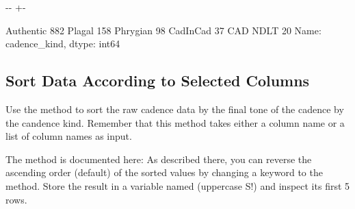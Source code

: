 \documentclass[letterpaper,10pt,english]{sphinxmanual}
\newlength\nbsphinxcodecellspacing
\begin{document}
{

\kern-\sphinxverbatimsmallskipamount\kern-\baselineskip
\kern+\FrameHeightAdjust\kern-\fboxrule
\vspace{\nbsphinxcodecellspacing}

\begin{sphinxVerbatim}[commandchars=\\\{\}]
\llap{\color{nbsphinxout}[22]:\,\hspace{\fboxrule}\hspace{\fboxsep}}Authentic    882
Plagal       158
Phrygian      98
CadInCad      37
CAD NDLT      20
Name: cadence\_kind, dtype: int64
\end{sphinxVerbatim}
}


\subsection{Sort Data According to Selected Columns}
\label{\detokenize{exercises/02_exercise:Sort-Data-According-to-Selected-Columns}}
Use the  method to sort the raw cadence data by the final tone of the cadence  by the candence kind. Remember that this method takes either a column name or a list of column names as input.

The  method is documented here:  As described there, you can reverse the ascending order (default) of the sorted values by changing a keyword to the method. Store the result in a variable named  (uppercase S!) and inspect its first 5 rows.

{
\begin{sphinxVerbatim}[commandchars=\\\{\}]
\llap{\color{nbsphinxin}[23]:\,\hspace{\fboxrule}\hspace{\fboxsep}}  \PYG{p}{[}\PYG{p}{]} 
\end{sphinxVerbatim}
}
\end{document}
